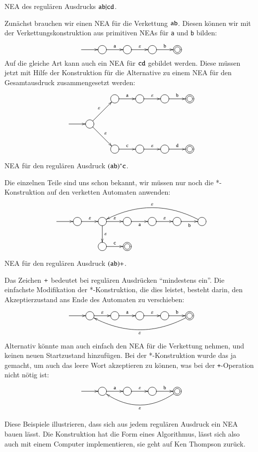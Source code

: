\begin{beispiel}[\bf Beispiel 1] NEA des regulären Ausdrucks
${\tt ab}|{\tt cd}$.

Zunächst brauchen wir einen NEA für die Verkettung ${\tt ab}$.
Diesen können wir mit der Verkettungskonstruktion aus primitiven
NEAs für {\tt a} und {\tt b} bilden:
\[
\entrymodifiers={++[o][F]}
\xymatrix{
*+\txt{}\ar[r]
	&{}\ar[r]^{\tt a}
		&{}\ar[r]^{\varepsilon}
			&{}\ar[r]^{\tt b}
				&*++[o][F=]{}
}
\]
Auf die gleiche Art kann auch ein NEA für ${\tt cd}$ gebildet werden.
Diese müssen jetzt mit Hilfe der Konstruktion für die Alternative
zu einem NEA für den Gesamtausdruck zusammengesetzt werden:
\[
\entrymodifiers={++[o][F]}
\xymatrix{
*+\txt{}
	&*+\txt{}
		&{}\ar[r]^{\tt a}
			&{}\ar[r]^{\varepsilon}
				&{}\ar[r]^{\tt b}
					&*++[o][F=]{}
\\
*+\txt{} \ar[r]
	&{}\ar[ur]^{\varepsilon} \ar[dr]^{\varepsilon}
\\
*+\txt{}
	&*+\txt{}
		&{}\ar[r]^{\tt c}
			&{}\ar[r]^{\varepsilon}
				&{}\ar[r]^{\tt d}
					&*++[o][F=]{}
}
\]
\end{beispiel}

\begin{beispiel}[\bf Beispiel 2] NEA für den regulären Ausdruck
$({\tt ab})^*{\tt c}$.

Die einzelnen Teile sind uns schon bekannt, wir müssen nur noch
die *-Konstruktion auf den verketten Automaten anwenden:
\[
\entrymodifiers={++[o][F]}
\xymatrix{
*+\txt{}\ar[r]
	&{}\ar[r]^{\varepsilon}
		&{}\ar[r]^{\varepsilon}
			\ar[d]^{\varepsilon}
			&\ar[r]_{\tt a}
				&{}\ar[r]^{\varepsilon}
					&{}\ar[r]_{\tt b}
						&{}\ar@/_20pt/[llll]_{\varepsilon}
\\
*+\txt{}
	&*+\txt{}
		&{}\ar[r]^{\tt c}
			&*++[o][F=]{}
}
\]
\end{beispiel}

\begin{beispiel}[\bf Beispiel 3:] NEA für den regulären Ausdruck
$({\tt ab})+$.

Das Zeichen ${\tt+}$ bedeutet bei regulären Ausdrücken ``mindestens ein''.
Die einfachste Modifikation der *-Konstruktion, die dies leistet, besteht
darin, den Akzeptierzustand ans Ende des Automaten zu verschieben:
\[
\entrymodifiers={++[o][F]}
\xymatrix{
*+\txt{}\ar[r]
	&{}\ar[r]^{\varepsilon}
		&{}\ar[r]^{\tt a}
			&{}\ar[r]^{\varepsilon}
				&{}\ar[r]^{\tt b}
					&*++[o][F=]{}\ar@/^20pt/[llll]^{\varepsilon}
}
\]
Alternativ könnte man auch einfach den NEA für die Verkettung
nehmen, und keinen neuen Startzustand hinzufügen.
Bei der
*-Konstruktion wurde das ja gemacht, um auch das leere Wort
akzeptieren zu können, was bei der {\tt +}-Operation nicht
nötig ist:
\[
\entrymodifiers={++[o][F]}
\xymatrix{
*+\txt{}\ar[r]
	&{}\ar[r]^{\tt a}
		&{}\ar[r]^{\varepsilon}
			&{}\ar[r]^{\tt b}
				&*++[o][F=]{}\ar@/^20pt/[lll]^{\varepsilon}
}
\]
\end{beispiel}
Diese Beispiele illustrieren, dass sich aus jedem regulären Ausdruck
ein NEA bauen lässt.
Die Konstruktion hat die Form eines Algorithmus,
lässt sich also auch mit einem Computer implementieren, sie geht
auf Ken Thompson zurück.
%

